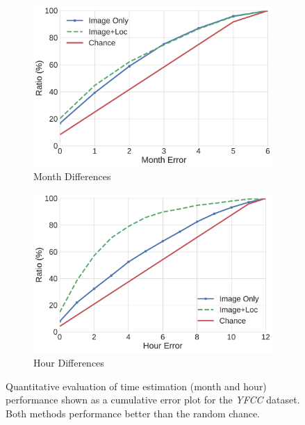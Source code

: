 \documentclass{bmvc2k}
\begin{document}
\begin{figure}
  \centering
  
  \begin{subfigure}[b]{0.45\linewidth}
    \includegraphics[width=\linewidth]{time_estimation/yfcc-month}
    \caption{Month Differences}
  \end{subfigure}
  \begin{subfigure}[b]{0.45\linewidth}
    \includegraphics[width=\linewidth]{time_estimation/yfcc-hour}
    \caption{Hour Differences}
  \end{subfigure}
  
  \caption{Quantitative evaluation of time estimation (month and hour)
  performance shown as a cumulative error plot for the {\em YFCC}
dataset. Both methods performance better than the random chance.}
  
  \label{fig:time_diff_err}
\end{figure}
\end{document}
